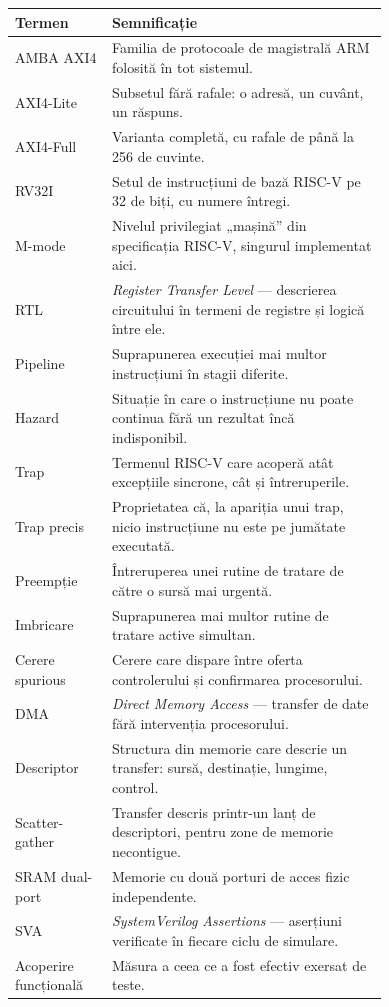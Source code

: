 \documentclass[11pt,openany]{report}
\begin{document}
\begin{table}[H]
\centering
\small
\begin{tabular}{@{}lL{0.74\linewidth}@{}}
\toprule
\textbf{Termen} & \textbf{Semnificație} \\
\midrule
AMBA AXI4 & Familia de protocoale de magistrală ARM folosită în tot sistemul. \\
AXI4-Lite & Subsetul fără rafale: o adresă, un cuvânt, un răspuns. \\
AXI4-Full & Varianta completă, cu rafale de până la 256 de cuvinte. \\
RV32I & Setul de instrucțiuni de bază RISC-V pe 32 de biți, cu numere întregi. \\
M-mode & Nivelul privilegiat „mașină” din specificația RISC-V, singurul implementat aici. \\
RTL & \emph{Register Transfer Level} --- descrierea circuitului în termeni de registre și logică între ele. \\
Pipeline & Suprapunerea execuției mai multor instrucțiuni în stagii diferite. \\
Hazard & Situație în care o instrucțiune nu poate continua fără un rezultat încă indisponibil. \\
Trap & Termenul RISC-V care acoperă atât excepțiile sincrone, cât și întreruperile. \\
Trap precis & Proprietatea că, la apariția unui trap, nicio instrucțiune nu este pe jumătate executată. \\
Preempție & Întreruperea unei rutine de tratare de către o sursă mai urgentă. \\
Imbricare & Suprapunerea mai multor rutine de tratare active simultan. \\
Cerere spurious & Cerere care dispare între oferta controlerului și confirmarea procesorului. \\
DMA & \emph{Direct Memory Access} --- transfer de date fără intervenția procesorului. \\
Descriptor & Structura din memorie care descrie un transfer: sursă, destinație, lungime, control. \\
Scatter-gather & Transfer descris printr-un lanț de descriptori, pentru zone de memorie necontigue. \\
SRAM dual-port & Memorie cu două porturi de acces fizic independente. \\
SVA & \emph{SystemVerilog Assertions} --- aserțiuni verificate în fiecare ciclu de simulare. \\
Acoperire funcțională & Măsura a ceea ce a fost efectiv exersat de teste. \\

\end{tabular}
\end{table}
\end{document}
